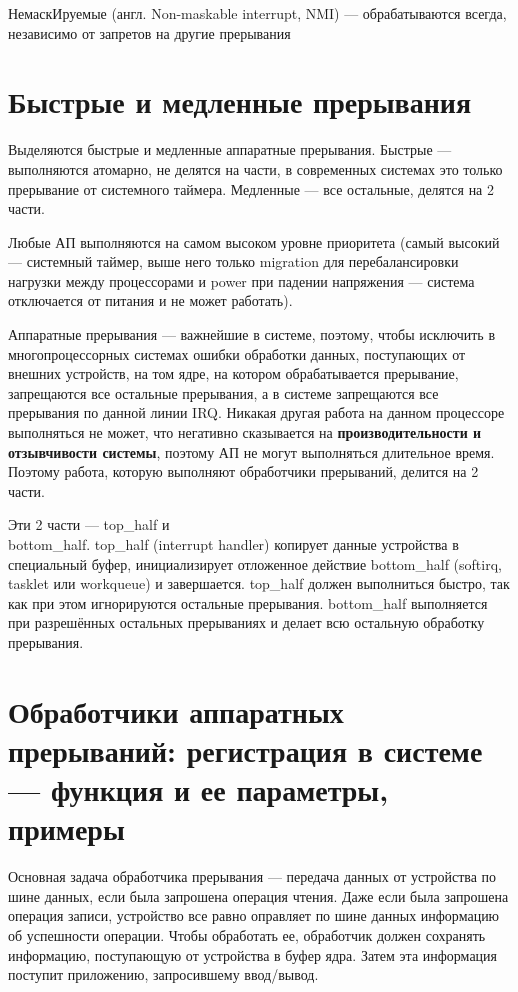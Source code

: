 НемаскИруемые (англ. Non-maskable interrupt, NMI) — обрабатываются всегда, независимо от запретов на другие прерывания

\section{Быстрые и медленные прерывания}

Выделяются быстрые и медленные аппаратные прерывания. Быстрые --- выполняются атомарно, не делятся на части, в современных системах это только прерывание от системного таймера. Медленные --- все остальные, делятся на 2 части.

Любые АП выполняются на самом высоком уровне приоритета (самый высокий --- системный таймер, выше него только migration для перебалансировки нагрузки между процессорами и power при падении напряжения --- система отключается от питания и не может работать).

Аппаратные прерывания --- важнейшие в системе, поэтому, чтобы исключить в многопроцессорных системах ошибки обработки данных, поступающих от внешних устройств, на том ядре, на котором обрабатывается прерывание, запрещаются все остальные прерывания, а в системе запрещаются все прерывания по данной линии IRQ. Никакая другая работа на данном процессоре выполняться не может, что негативно сказывается на \textbf{производительности и отзывчивости системы}, поэтому АП не могут выполняться длительное время. Поэтому работа, которую выполняют обработчики прерываний, делится на 2 части.

Эти 2 части --- top\_half и  \\ bottom\_half. top\_half (interrupt handler) копирует данные устройства в специальный буфер, инициализирует отложенное действие bottom\_half (softirq, tasklet или workqueue) и завершается. top\_half должен выполниться быстро, так как при этом игнорируются остальные прерывания. bottom\_half выполняется при разрешённых остальных прерываниях и делает всю остальную обработку прерывания.

\section{Обработчики аппаратных прерываний: регистрация в системе --- функция и ее параметры, примеры}

Основная задача обработчика прерывания --- передача данных от устройства по шине данных, если была запрошена операция чтения. Даже если была запрошена операция записи, устройство все равно оправляет по шине данных информацию об успешности операции. Чтобы обработать ее, обработчик должен сохранять информацию, поступающую от устройства в буфер ядра. Затем эта информация поступит приложению, запросившему ввод/вывод.

